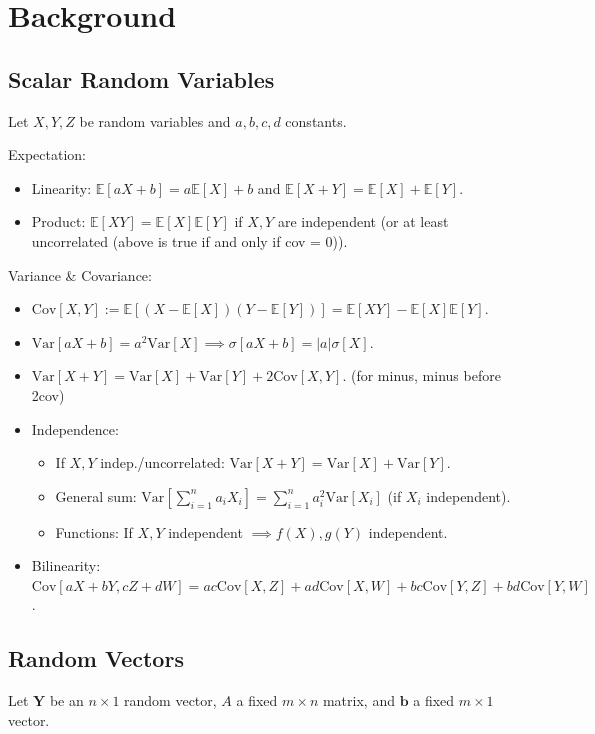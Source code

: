 \section{Background}

\subsection*{Scalar Random Variables}
Let $X, Y, Z$ be random variables and $a, b, c, d$ constants.

Expectation:
\begin{itemize}
    \item Linearity: $\mathbb{E}[aX + b] = a\mathbb{E}[X] + b$ and $\mathbb{E}[X+Y] = \mathbb{E}[X] + \mathbb{E}[Y]$.
    \item Product: $\mathbb{E}[XY] = \mathbb{E}[X]\mathbb{E}[Y]$ if $X, Y$ are independent (or at least uncorrelated (above is true if and only if cov = 0)).
\end{itemize}

Variance \& Covariance:
\begin{itemize}
    \item $\text{Cov}[X,Y] := \mathbb{E}[(X - \mathbb{E}[X])(Y - \mathbb{E}[Y])] = \mathbb{E}[XY] - \mathbb{E}[X]\mathbb{E}[Y]$.
    \item $\text{Var}[aX + b] = a^2 \text{Var}[X] \implies \sigma[aX+b] = |a|\sigma[X]$.
    \item $\text{Var}[X + Y] = \text{Var}[X] + \text{Var}[Y] + 2\text{Cov}[X,Y]$. (for minus, minus before 2cov)
    \item Independence:
    \begin{itemize}
        \item If $X, Y$ indep./uncorrelated: $\text{Var}[X+Y] = \text{Var}[X] + \text{Var}[Y]$.
        \item General sum: $\text{Var}[\sum_{i=1}^n a_i X_i] = \sum_{i=1}^n a_i^2 \text{Var}[X_i]$ (if $X_i$ independent).
        \item Functions: If $X, Y$ independent $\implies f(X), g(Y)$ independent.
    \end{itemize}
    \item Bilinearity:
    $\text{Cov}[aX + bY, cZ + dW] = ac\text{Cov}[X,Z] + ad\text{Cov}[X,W] + bc\text{Cov}[Y,Z] + bd\text{Cov}[Y,W]$.
\end{itemize}

\subsection*{Random Vectors}
Let $\mathbf{Y}$ be an $n \times 1$ random vector, $A$ a fixed $m \times n$ matrix, and $\mathbf{b}$ a fixed $m \times 1$ vector.

